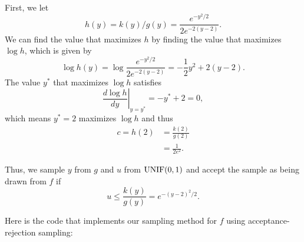 \documentclass[
]{article}
\begin{document}
First, we let \[
  h(y) = k(y)/g(y) = \frac{e^{-y^2/2}}{2e^{-2(y-2)}}.
\] We can find the value that maximizes \(h\) by finding the value that
maximizes \(\log h\), which is given by \[
  \log h(y) = \log \frac{e^{-y^2/2}}{2e^{-2(y-2)}} = -\frac{1}{2}y^2 + 2(y-2).
\] The value \(y^*\) that maximizes \(\log h\) satisfies \[
  \left. \frac{d \log h}{d y} \right\vert_{y=y^*} = -y^* + 2 = 0,
\] which means \(y^*=2\) maximizes \(\log h\) and thus \begin{align}
  c = h(2) &= \frac{k(2)}{g(2)}\\
           &= \frac{1}{2e^2}.
\end{align}

Thus, we sample \(y\) from \(g\) and \(u\) from \(\rm{UNIF}(0,1)\) and
accept the sample as being drawn from \(f\) if \[
  u \leq \frac{k(y)}{g(y)} = e^{-(y-2)^2/2}.
\]

Here is the code that implements our sampling method for \(f\) using
acceptance-rejection sampling:
\end{document}

